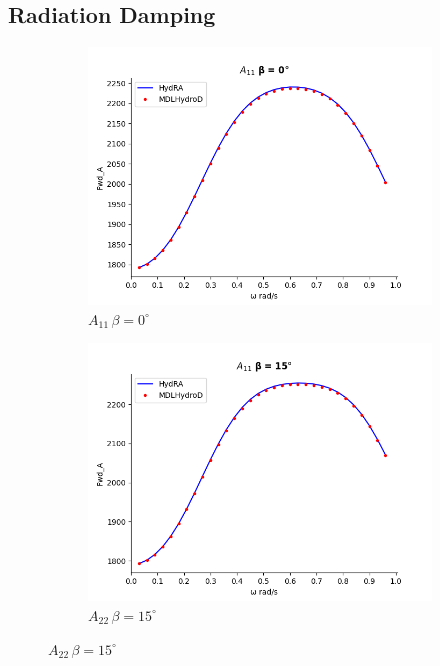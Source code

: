\subsection{Radiation Damping}
\begin{figure}[H]
    \centering
    \begin{subfigure}[b]{0.45\textwidth}
        \includegraphics[width=\textwidth]{plots/kcs/added_mass/A11_BETA_0.png}
        \caption{$A_{11}\, \beta=0^{\circ}$}
    \end{subfigure}
    \begin{subfigure}[b]{0.45\textwidth}
        \includegraphics[width=\textwidth]{plots/kcs/added_mass/A11_BETA_15.png}
        \caption{$A_{22} \, \beta = 15^{\circ}$}
    \end{subfigure}
    \label{fig:kcs_addedmass_3}
\end{figure}

